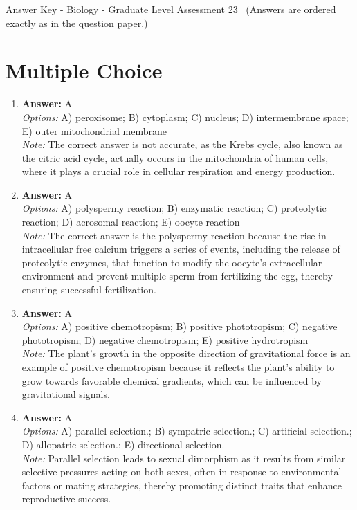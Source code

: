 \documentclass[12pt]{article}
\begin{document}
\begin{center}
Answer Key - Biology - Graduate Level Assessment 23 \
\small (Answers are ordered exactly as in the question paper.)
\end{center}

\section*{Multiple Choice}
\begin{enumerate}[label=\arabic*.]
\item \textbf{Answer:} A
\\ \textit{Options:} A) peroxisome; B) cytoplasm; C) nucleus; D) intermembrane space; E) outer mitochondrial membrane
\\ \textit{Note:} The correct answer is not accurate, as the Krebs cycle, also known as the citric acid cycle, actually occurs in the mitochondria of human cells, where it plays a crucial role in cellular respiration and energy production.
\item \textbf{Answer:} A
\\ \textit{Options:} A) polyspermy reaction; B) enzymatic reaction; C) proteolytic reaction; D) acrosomal reaction; E) oocyte reaction
\\ \textit{Note:} The correct answer is the polyspermy reaction because the rise in intracellular free calcium triggers a series of events, including the release of proteolytic enzymes, that function to modify the oocyte's extracellular environment and prevent multiple sperm from fertilizing the egg, thereby ensuring successful fertilization.
\item \textbf{Answer:} A
\\ \textit{Options:} A) positive chemotropism; B) positive phototropism; C) negative phototropism; D) negative chemotropism; E) positive hydrotropism
\\ \textit{Note:} The plant's growth in the opposite direction of gravitational force is an example of positive chemotropism because it reflects the plant's ability to grow towards favorable chemical gradients, which can be influenced by gravitational signals.
\item \textbf{Answer:} A
\\ \textit{Options:} A) parallel selection.; B) sympatric selection.; C) artificial selection.; D) allopatric selection.; E) directional selection.
\\ \textit{Note:} Parallel selection leads to sexual dimorphism as it results from similar selective pressures acting on both sexes, often in response to environmental factors or mating strategies, thereby promoting distinct traits that enhance reproductive success.

\end{enumerate}
\end{document}
